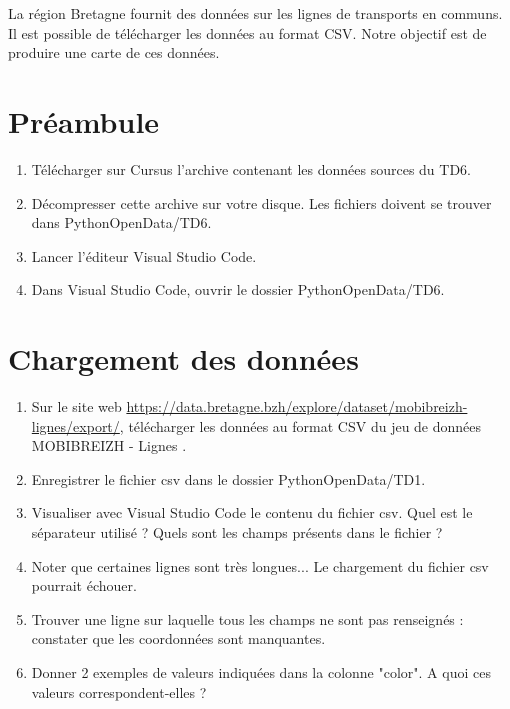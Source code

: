 \documentclass[11pt,a4paper]{article}
\begin{document}
La région Bretagne fournit des données sur les lignes de transports en communs.
Il est possible de télécharger les données au format CSV. Notre objectif est de produire une carte de ces données.


\section*{Préambule}
\begin{enumerate}
    \item Télécharger sur Cursus l'archive contenant les données sources du TD6.
    \item Décompresser cette archive sur votre disque. 
    Les fichiers doivent se trouver dans PythonOpenData/TD6.
    \item Lancer l'éditeur Visual Studio Code.
    \item Dans Visual Studio Code, ouvrir le dossier PythonOpenData/TD6. 
\end{enumerate}



\section{Chargement des données}

\begin{enumerate}
    \item Sur le site web \url{https://data.bretagne.bzh/explore/dataset/mobibreizh-lignes/export/}, télécharger les données au format CSV du jeu de données \og MOBIBREIZH - Lignes \fg.
    \item Enregistrer le fichier csv dans le dossier PythonOpenData/TD1.
    \item Visualiser avec Visual Studio Code le contenu du fichier csv. Quel est le séparateur utilisé ? Quels sont les champs présents dans le fichier ?
    \item Noter que certaines lignes sont très longues... Le chargement du fichier csv pourrait échouer. 
    \item Trouver une ligne sur laquelle tous les champs ne sont pas renseignés : constater que les coordonnées sont manquantes.
    \item Donner 2 exemples de valeurs indiquées dans la colonne "color". A quoi ces valeurs correspondent-elles ?
   \end{enumerate}
\end{document}
